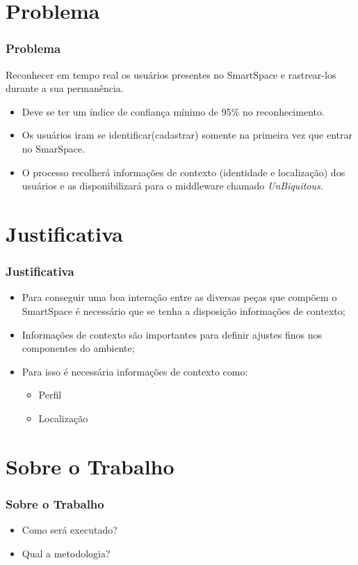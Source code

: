 \documentclass{beamer}
\begin{document}
\section{Problema}
\begin{frame}
    \frametitle{Problema}
    Reconhecer em tempo real os usuários presentes no SmartSpace e rastrear-los durante a sua permanência. \\
	\begin{itemize}
      		\pause \item Deve se ter um índice de confiança mínimo de 95\% no reconhecimento. \\
		\pause \item Os usuários iram se identificar(cadastrar) somente na primeira vez que entrar no SmarSpace. \\
    		\pause \item O processo recolherá informações de contexto (identidade e localização) dos usuários e as disponibilizará para o middleware chamado \it{UnBiquitous}.
	\end{itemize}
\end{frame}

\section{Justificativa} 
\begin{frame}
    \frametitle{Justificativa}
    \begin{itemize}
      \item Para conseguir uma boa interação entre as diversas peças que compõem o SmartSpace é necessário que se tenha a disposição informações de contexto;
      \item Informações de contexto são importantes para definir ajustes finos nos componentes do ambiente;
      \item Para isso é necessária informações de contexto como:
	    \begin{itemize}
		\item Perfil
		\item Localização
	    \end{itemize}
    \end{itemize}
\end{frame}


\section{Sobre o Trabalho}
\begin{frame}
    \frametitle{Sobre o Trabalho}
    \begin{itemize}
        \item Como será executado?
        \item Qual a metodologia?
    \end{itemize}
\end{frame}
\end{document}
